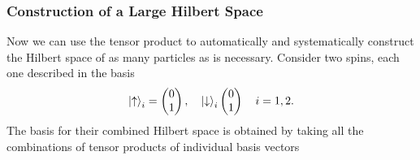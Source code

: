 \documentclass{article}
\begin{document}
\subsubsection{Construction of a Large Hilbert Space}
Now we can use the tensor product to automatically and systematically construct the Hilbert space of as many particles as is necessary. Consider two spins, each one described in the basis
\[
    \ket{\uparrow}_i=\begin{pmatrix}
        0\\1
    \end{pmatrix},\quad \ket{\downarrow}_i\begin{pmatrix}
        0 \\1
    \end{pmatrix}\quad i=1,2.
\]
The basis for their combined Hilbert space is obtained by taking all the combinations of tensor products of individual basis vectors
\end{document}
